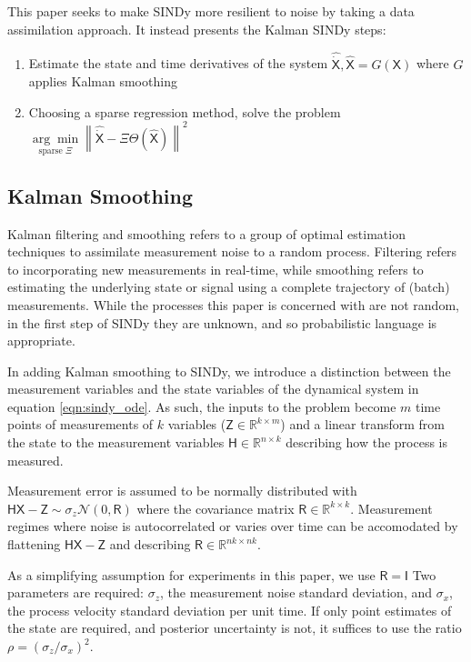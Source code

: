 \documentclass{ACCESS_latex_template_20231118/ieeeaccess}
\newcommand{\mat}[1]{\boldsymbol{\mathsf{#1}}}
\newcommand{\R}[1]{\mathbb{R}^{#1}}
\begin{document}

This paper seeks to make SINDy more resilient to noise by taking a data assimilation approach.  It instead presents the Kalman SINDy steps:
\begin{enumerate}
    \item Estimate the state and time derivatives of the system ${\mat{\widehat{\dot X}}}, \mat{\widehat X} = G(\mat X)$ where $G$ applies Kalman smoothing
    \item Choosing a sparse regression method, solve the problem $\underset{\text{sparse } \mat \Xi}{\arg\min} \left\| \mat{\widehat{\dot{X}}} - \mat \Xi \mat \Theta(\mat {\widehat X}) \right\|^2$
\end{enumerate}

\subsection{Kalman Smoothing}

Kalman filtering and smoothing refers to a group of optimal estimation techniques to assimilate measurement noise to a random process.
Filtering refers to incorporating  new measurements in real-time, while smoothing refers to estimating the underlying state or signal using a complete trajectory of (batch) measurements.
While the processes this paper is concerned with are not random, in the first step of SINDy they are unknown, and so probabilistic language is appropriate.

In adding Kalman smoothing to SINDy, we introduce a distinction between the measurement variables and the state variables of the dynamical system in equation
\ref{eqn:sindy_ode}.  As such, the inputs to the problem become $m$ time points of measurements of $k$ variables ($\mat Z\in \R{k\times m}$) and a linear transform from the state to the measurement variables $\mat H \in \R{n \times k}$ describing how the process is measured.

Measurement error is assumed to be normally distributed with $\mat H \mat X - \mat Z \sim \sigma_z \mathcal N(0, \mat R)$ where the covariance matrix $\mat R\in\R{k \times k}$.  Measurement regimes where noise is autocorrelated or varies over time can be accomodated by flattening $\mat H \mat X - \mat Z$ and describing $\mat R\in\R{nk \times nk}$.

As a simplifying assumption for experiments in this paper, we use $\mat R=\mat I$ Two parameters are required: $\sigma_z$, the measurement noise standard deviation, and $\sigma_x$, the process velocity standard deviation per unit time.  If only point estimates of the state are required, and posterior uncertainty is not, it suffices to use the ratio $\rho = (\sigma_z / \sigma_x)^2$.
\end{document}
